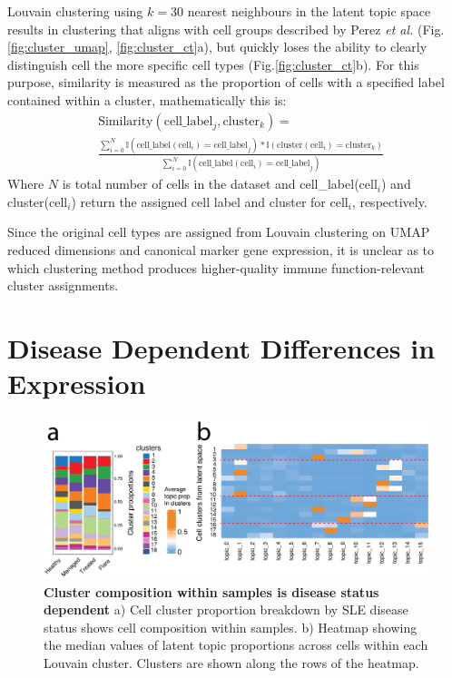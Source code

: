 Louvain clustering \cite{louvain} using $k=30$ nearest neighbours in the latent topic space results in clustering that aligns with cell groups described by Perez \textit{et al.} \cite{sledata} (Fig.\ref{fig:cluster_umap}, \ref{fig:cluster_ct}a), but quickly loses the ability to clearly distinguish cell the more specific cell types (Fig.\ref{fig:cluster_ct}b). For this purpose, similarity is measured as the proportion of cells with a specified label contained within a cluster, mathematically this is: 
\begin{align*}
    &\text{Similarity}(\text{cell\_label}_j, \text{cluster}_k) = \\ &\frac{\sum_{i = 0}^N \mathbb{I}(\text{cell\_label}(\text{cell}_i) = \text{cell\_label}_j) * \mathbb{I}(\text{cluster}(\text{cell}_i) = \text{cluster}_k)}{\sum_{i = 0}^N \mathbb{I}(\text{cell\_label}(\text{cell}_i) = \text{cell\_label}_j)}
\end{align*} 
Where $N$ is total number of cells in the dataset and cell\_label(cell$_i$) and cluster(cell$_i$) return the assigned cell label and cluster for cell$_i$, respectively.

Since the original cell types are assigned from Louvain clustering on UMAP reduced dimensions and canonical marker gene expression, it is unclear as to which clustering method produces higher-quality immune function-relevant cluster assignments. 

\newpage
\section{Disease Dependent Differences in Expression}

\begin{figure}
    \centering
    \includegraphics[width=\textwidth]{Figures/disease_strat_sftmx.png}
    \caption{\textbf{Cluster composition within samples is disease status dependent} a) Cell cluster proportion breakdown by SLE disease status shows cell composition within samples. b) Heatmap showing the median values of latent topic proportions across cells within each Louvain cluster. Clusters are shown along the rows of the heatmap.}
    \label{fig:diseasestrat}
\end{figure}

